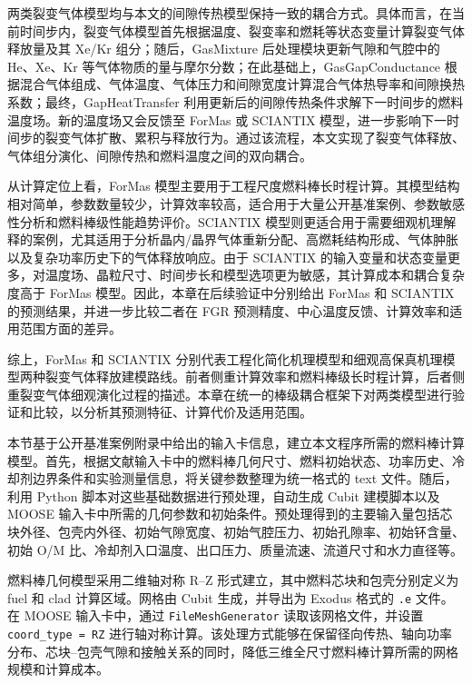 两类裂变气体模型均与本文的间隙传热模型保持一致的耦合方式。具体而言，在当前时间步内，裂变气体模型首先根据温度、裂变率和燃耗等状态变量计算裂变气体释放量及其 Xe/Kr 组分；随后，GasMixture 后处理模块更新气隙和气腔中的 He、Xe、Kr 等气体物质的量与摩尔分数；在此基础上，GasGapConductance 根据混合气体组成、气体温度、气体压力和间隙宽度计算混合气体热导率和间隙换热系数；最终，GapHeatTransfer 利用更新后的间隙传热条件求解下一时间步的燃料温度场。新的温度场又会反馈至 ForMas 或 SCIANTIX 模型，进一步影响下一时间步的裂变气体扩散、累积与释放行为。通过该流程，本文实现了裂变气体释放、气体组分演化、间隙传热和燃料温度之间的双向耦合。

从计算定位上看，ForMas 模型主要用于工程尺度燃料棒长时程计算。其模型结构相对简单，参数数量较少，计算效率较高，适合用于大量公开基准案例、参数敏感性分析和燃料棒级性能趋势评价。SCIANTIX 模型则更适合用于需要细观机理解释的案例，尤其适用于分析晶内/晶界气体重新分配、高燃耗结构形成、气体肿胀以及复杂功率历史下的气体释放响应。由于 SCIANTIX 的输入变量和状态变量更多，对温度场、晶粒尺寸、时间步长和模型选项更为敏感，其计算成本和耦合复杂度高于 ForMas 模型。因此，本章在后续验证中分别给出 ForMas 和 SCIANTIX 的预测结果，并进一步比较二者在 FGR 预测精度、中心温度反馈、计算效率和适用范围方面的差异。

综上，ForMas 和 SCIANTIX 分别代表工程化简化机理模型和细观高保真机理模型两种裂变气体释放建模路线。前者侧重计算效率和燃料棒级长时程计算，后者侧重裂变气体细观演化过程的描述。本章在统一的棒级耦合框架下对两类模型进行验证和比较，以分析其预测特征、计算代价及适用范围。


本节基于公开基准案例附录中给出的输入卡信息，建立本文程序所需的燃料棒计算模型。首先，根据文献输入卡中的燃料棒几何尺寸、燃料初始状态、功率历史、冷却剂边界条件和实验测量信息，将关键参数整理为统一格式的 text 文件。随后，利用 Python 脚本对这些基础数据进行预处理，自动生成 Cubit 建模脚本以及 MOOSE 输入卡中所需的几何参数和初始条件。预处理得到的主要输入量包括芯块外径、包壳内外径、初始气隙宽度、初始气腔压力、初始孔隙率、初始钚含量、初始 O/M 比、冷却剂入口温度、出口压力、质量流速、流道尺寸和水力直径等。

燃料棒几何模型采用二维轴对称 R--Z 形式建立，其中燃料芯块和包壳分别定义为 fuel 和 clad 计算区域。网格由 Cubit 生成，并导出为 Exodus 格式的 \texttt{.e} 文件。在 MOOSE 输入卡中，通过 \texttt{FileMeshGenerator} 读取该网格文件，并设置 \texttt{coord\_type = RZ} 进行轴对称计算。该处理方式能够在保留径向传热、轴向功率分布、芯块--包壳气隙和接触关系的同时，降低三维全尺寸燃料棒计算所需的网格规模和计算成本。

